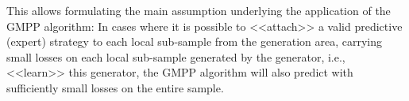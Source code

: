 \documentclass[12pt, twoside]{article}
\begin{document}
This allows formulating the main assumption underlying the application of the GMPP algorithm: In cases where it is possible to <<attach>> a valid predictive (expert) strategy to each local sub-sample from the generation area, carrying small losses on each local sub-sample generated by the generator, i.e., <<learn>> this generator, the GMPP algorithm will also predict with sufficiently small losses on the entire sample.






%
%
%
\end{document}
